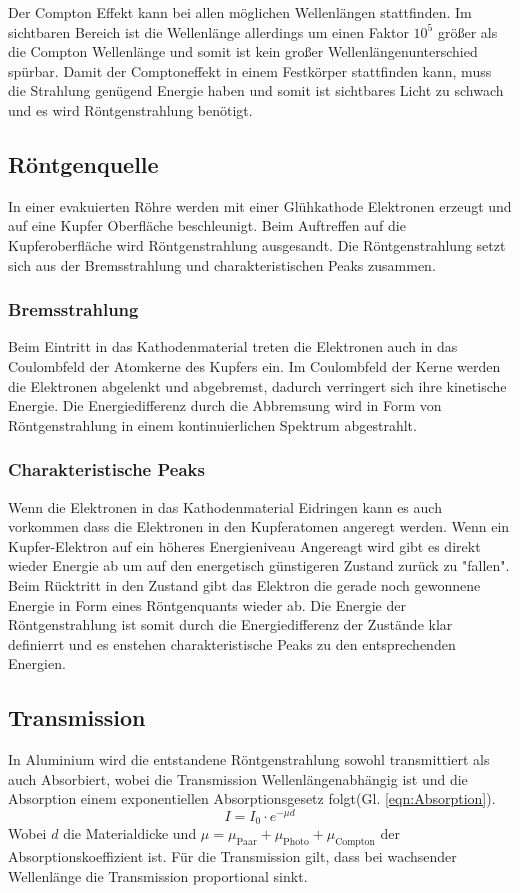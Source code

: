 Der Compton Effekt kann bei allen möglichen Wellenlängen stattfinden.
Im sichtbaren Bereich ist die Wellenlänge allerdings um einen Faktor $10^5$ größer als die Compton Wellenlänge und somit ist kein großer Wellenlängenunterschied spürbar.
Damit der Comptoneffekt in einem Festkörper stattfinden kann, muss die Strahlung genügend Energie haben und somit ist sichtbares Licht zu schwach und es wird Röntgenstrahlung benötigt.


\subsection{Röntgenquelle}
In einer evakuierten Röhre werden mit einer Glühkathode Elektronen erzeugt und auf eine Kupfer Oberfläche beschleunigt.
Beim Auftreffen auf die Kupferoberfläche wird Röntgenstrahlung ausgesandt. Die Röntgenstrahlung setzt sich aus der Bremsstrahlung und charakteristischen Peaks zusammen.

\subsubsection{Bremsstrahlung}
Beim Eintritt in das Kathodenmaterial treten die Elektronen auch in das Coulombfeld der Atomkerne des Kupfers ein.
Im Coulombfeld der Kerne werden die Elektronen abgelenkt und abgebremst, dadurch verringert sich ihre kinetische Energie.
Die Energiedifferenz durch die Abbremsung wird in Form von Röntgenstrahlung in einem kontinuierlichen Spektrum abgestrahlt.

\subsubsection{Charakteristische Peaks}
Wenn die Elektronen in das Kathodenmaterial Eidringen kann es auch vorkommen dass die Elektronen in den Kupferatomen angeregt werden.
Wenn ein Kupfer-Elektron auf ein höheres Energieniveau Angereagt wird gibt es direkt wieder Energie ab um auf den energetisch günstigeren Zustand zurück zu "fallen".
Beim Rücktritt in den Zustand gibt das Elektron die gerade noch gewonnene Energie in Form eines Röntgenquants wieder ab.
Die Energie der Röntgenstrahlung ist somit durch die Energiedifferenz der Zustände klar definierrt und es enstehen charakteristische Peaks zu den entsprechenden Energien.

\subsection{Transmission}
In Aluminium wird die entstandene Röntgenstrahlung sowohl transmittiert als auch Absorbiert, wobei die Transmission Wellenlängenabhängig ist und die Absorption einem exponentiellen Absorptionsgesetz folgt(Gl. \ref{eqn:Absorption}).
\begin{equation}
    I = I_0 \cdot e^{-\mu d} \label{eqn:Absorption}
\end{equation}
Wobei $d$ die Materialdicke und $\mu = \mu_{\text{Paar}}+\mu_{\text{Photo}}+\mu_{\text{Compton}}$ der Absorptionskoeffizient ist.
Für die Transmission gilt, dass bei wachsender Wellenlänge die Transmission proportional sinkt.

